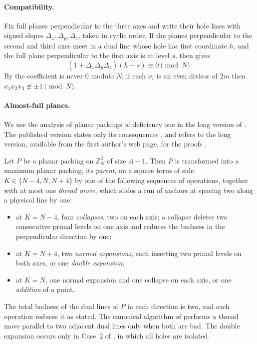 \documentclass[11pt,colorlinks]{charlie}
\newcommand{\ZN}{\mathbb{Z}_N}
\begin{document}
\paragraph{Compatibility.}
Fix full planes perpendicular to the three axes and write their hole lines with signed slopes $\Delta_x,\Delta_y,\Delta_z$, taken in cyclic order. If the planes perpendicular to the second and third axes meet in a dual line whose hole has first coordinate $h$, and the full plane perpendicular to the first axis is at level $s$, then \cite[Lemma~12]{BHN} gives
\begin{equation}\label{eq:compat}
 (1+\Delta_x\Delta_y\Delta_z)(h-s)\equiv0\pmod N .
\end{equation}
By \cite[Lemma~13]{BHN} the coefficient is never $0$ modulo $N$: if each $x_i$ is an even divisor of $2m$ then $x_1x_2x_3\not\equiv\pm1\pmod N$.

\paragraph{Almost-full planes.}
We use the analysis of planar packings of deficiency one in the long version of \cite{BHN}. The published version states only its consequences \cite[Section~1]{BHN}, and refers to the long version, available from the first author's web page, for the proofs \cite{BHNlong}.

\begin{theorem}\label{fact:reduction}
Let $P$ be a planar packing on $\ZN^2$ of size $A-1$. Then $P$ is transformed into a maximum planar packing, its \emph{parent}, on a square torus of side $K\in\{N-4,N,N+4\}$ by one of the following sequences of operations, together with at most one \emph{thread move}, which slides a run of anchors at spacing two along a physical line by one:
\begin{itemize}
\item at $K=N-4$, four \emph{collapses}, two on each axis; a collapse deletes two consecutive primal levels on one axis and reduces the badness in the perpendicular direction by one;
\item at $K=N+4$, two \emph{normal expansions}, each inserting two primal levels on both axes, or one \emph{double expansion};
\item at $K=N$, one normal expansion and one collapse on each axis, or one \emph{addition} of a point.
\end{itemize}
The total badness of the dual lines of $P$ in each direction is two, and each operation reduces it as stated. The canonical algorithm of \cite[Section~3.2.1]{BHNlong} performs a thread move parallel to two adjacent dual lines only when both are bad. The double expansion occurs only in Case~2 of \cite[Section~3.2.2]{BHNlong}, in which all holes are isolated.
\end{theorem}
\end{document}
